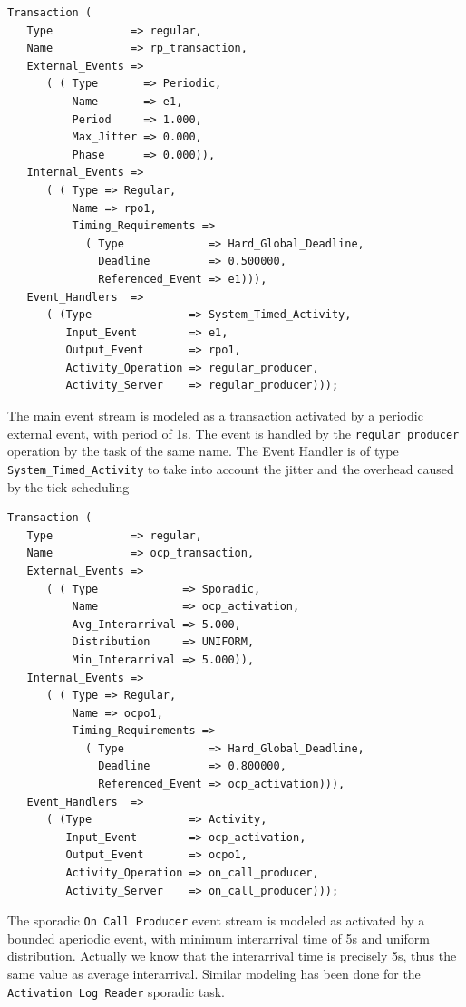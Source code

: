 \documentclass{article}
\begin{document}
\begin{lstlisting}
Transaction (
   Type            => regular,
   Name            => rp_transaction,
   External_Events =>
      ( ( Type       => Periodic,
          Name       => e1,
          Period     => 1.000,
          Max_Jitter => 0.000,
          Phase      => 0.000)),
   Internal_Events =>
      ( ( Type => Regular,
          Name => rpo1,
          Timing_Requirements =>
            ( Type             => Hard_Global_Deadline,
              Deadline         => 0.500000,
              Referenced_Event => e1))),
   Event_Handlers  =>
      ( (Type               => System_Timed_Activity,
         Input_Event        => e1,
         Output_Event       => rpo1,
         Activity_Operation => regular_producer,
         Activity_Server    => regular_producer)));
\end{lstlisting}

The main event stream is modeled as a transaction activated by a periodic external event, with period of 1s. The event is handled by the \texttt{regular\_producer} operation by the task of the same name. The Event Handler is of type \texttt{System\_Timed\_Activity} to take into account the jitter and the overhead caused by the tick scheduling

\begin{lstlisting}
Transaction (
   Type            => regular,
   Name            => ocp_transaction,
   External_Events =>
      ( ( Type             => Sporadic,
          Name             => ocp_activation,
          Avg_Interarrival => 5.000,
          Distribution     => UNIFORM,
          Min_Interarrival => 5.000)),
   Internal_Events =>
      ( ( Type => Regular,
          Name => ocpo1,
          Timing_Requirements =>
            ( Type             => Hard_Global_Deadline,
              Deadline         => 0.800000,
              Referenced_Event => ocp_activation))),
   Event_Handlers  =>
      ( (Type               => Activity,
         Input_Event        => ocp_activation,
         Output_Event       => ocpo1,
         Activity_Operation => on_call_producer,
         Activity_Server    => on_call_producer)));
\end{lstlisting}

The sporadic \texttt{On Call Producer} event stream is modeled as activated by a bounded aperiodic event, with minimum interarrival time of 5s and uniform distribution. Actually we know that the interarrival time is precisely 5s, thus the same value as average interarrival. Similar modeling has been done for the \texttt{Activation Log Reader} sporadic task.
\end{document}
